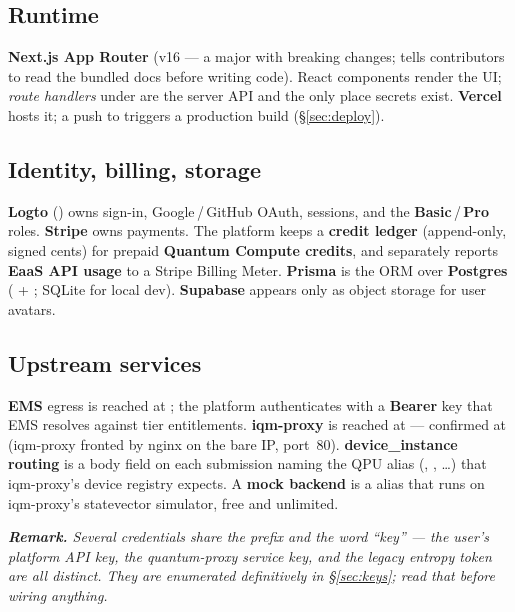 \documentclass[11pt]{article}
\newenvironment{remark}
  {\par\medskip\noindent\small\itshape\textbf{\upshape Remark.}\hspace{0.4em}\ignorespaces}
  {\par\medskip}
\begin{document}
\subsection{Runtime}
\textbf{Next.js App Router} (v16 --- a major with breaking changes;  tells contributors to read the
bundled docs before writing code). React components render the UI; \emph{route handlers} under  are the
server API and the only place secrets exist. \textbf{Vercel} hosts it; a push to  triggers a production build
(\S\ref{sec:deploy}).

\subsection{Identity, billing, storage}
\textbf{Logto} () owns sign-in, Google\,/\,GitHub OAuth, sessions, and the \textbf{Basic}\,/\,\textbf{Pro}
roles. \textbf{Stripe} owns payments. The platform keeps a \textbf{credit ledger} (append-only, signed cents) for prepaid
\textbf{Quantum Compute credits}, and separately reports \textbf{EaaS API usage} to a Stripe Billing Meter.
\textbf{Prisma} is the ORM over \textbf{Postgres} ( + ; SQLite for local dev).
\textbf{Supabase} appears only as object storage for user avatars.

\subsection{Upstream services}
\textbf{EMS} egress is reached at ; the platform authenticates with a \textbf{Bearer} key that EMS
resolves against tier entitlements. \textbf{iqm-proxy} is reached at  --- confirmed at
 (iqm-proxy fronted by nginx on the bare IP, port~80). \textbf{device\_instance routing} is a
body field on each submission naming the QPU alias (, , \dots) that iqm-proxy's device
registry expects. A \textbf{mock backend} is a  alias that runs on iqm-proxy's statevector simulator, free and
unlimited.

\begin{remark}
Several credentials share the  prefix and the word ``key'' --- the user's platform API key, the quantum-proxy
service key, and the legacy entropy token are all distinct. They are enumerated definitively in
\S\ref{sec:keys}; read that before wiring anything.
\end{remark}
\end{document}
